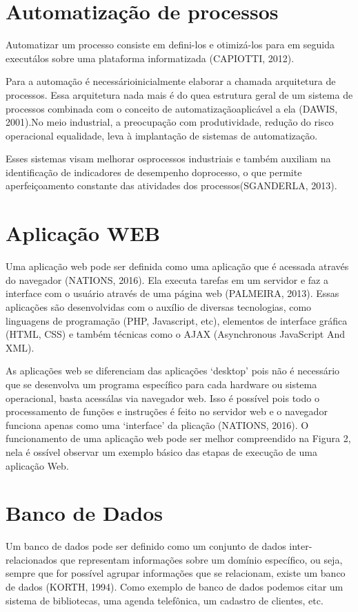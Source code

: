 \vspace{-42pt}
\section[Automatização de processos]{Automatização de processos}
Automatizar um processo consiste em defini-los e otimizá-los para em seguida executálos sobre uma plataforma informatizada (CAPIOTTI, 2012). 

Para a automação é necessárioinicialmente elaborar a chamada arquitetura de processos. Essa arquitetura nada mais é do quea estrutura geral de um sistema de processos combinada com o conceito de automatizaçãoaplicável a ela (DAWIS, 2001).No meio industrial, a preocupação com produtividade, redução do risco operacional equalidade, leva à implantação de sistemas de automatização. 

Esses sistemas visam melhorar osprocessos industriais e também auxiliam na identificação de indicadores de desempenho doprocesso, o que permite aperfeiçoamento constante das atividades dos processos(SGANDERLA, 2013).

\section[Aplicação WEB]{Aplicação WEB}
Uma aplicação web pode ser definida como uma aplicação que é acessada através do navegador (NATIONS, 2016). Ela executa tarefas em um servidor e faz a interface com o usuário através de uma página web (PALMEIRA, 2013). Essas aplicações são desenvolvidas com o auxílio de diversas tecnologias, como linguagens de programação (PHP, Javascript, etc), elementos de interface gráfica (HTML, CSS) e também técnicas como o AJAX (Asynchronous JavaScript And XML).

As aplicações web se diferenciam das aplicações ‘desktop’ pois não é necessário que se desenvolva um programa específico para cada hardware ou sistema operacional, basta acessálas via navegador web. Isso é possível pois todo o processamento de funções e instruções é feito no servidor web e o navegador funciona apenas como uma ‘interface’ da  plicação (NATIONS, 2016). O funcionamento de uma aplicação web pode ser melhor compreendido na Figura 2, nela é ossível observar um exemplo básico das etapas de execução de uma aplicação Web.

\section[Banco de Dados]{Banco de Dados}
Um banco de dados pode ser definido como um conjunto de dados inter-relacionados que representam informações sobre um domínio específico, ou seja, sempre que for possível agrupar informações que se relacionam, existe um banco de dados (KORTH, 1994). Como exemplo de banco de dados podemos citar um sistema de bibliotecas, uma agenda telefônica,
um cadastro de clientes, etc.

